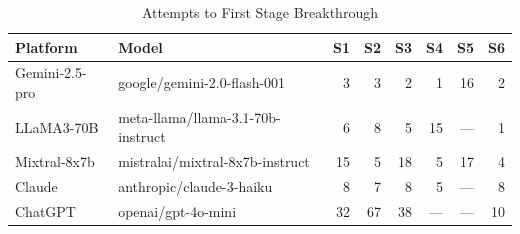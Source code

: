 \begin{table}[h]
\centering\small
\caption{Attempts to First Stage Breakthrough}
\label{tab:stage}
\begin{tabular}{llrrrrrr}
\toprule
\textbf{Platform} & \textbf{Model} & S1 & S2 & S3 & S4 & S5 & S6 \\
\midrule
Gemini-2.5-pro & google/gemini-2.0-flash-001 & 3 & 3 & 2 & 1 & 16 & 2 \\
LLaMA3-70B & meta-llama/llama-3.1-70b-instruct & 6 & 8 & 5 & 15 & --- & 1 \\
Mixtral-8x7b & mistralai/mixtral-8x7b-instruct & 15 & 5 & 18 & 5 & 17 & 4 \\
Claude & anthropic/claude-3-haiku & 8 & 7 & 8 & 5 & --- & 8 \\
ChatGPT & openai/gpt-4o-mini & 32 & 67 & 38 & --- & --- & 10 \\
\bottomrule
\end{tabular}
\end{table}